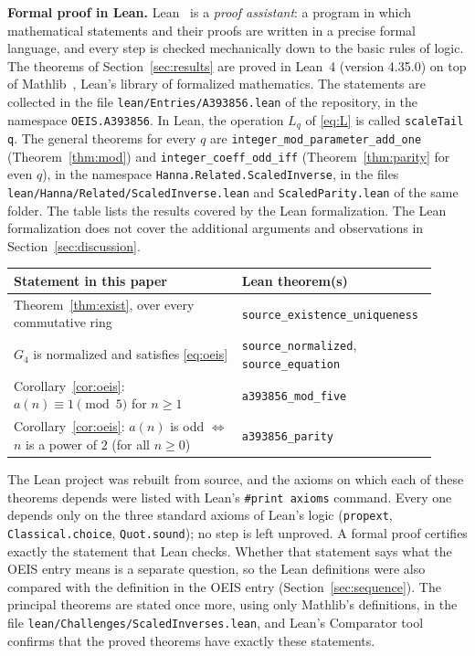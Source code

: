 \documentclass[11pt,a4paper]{article}
\theoremstyle{definition}
\theoremstyle{remark}
\newcommand{\para}[1]{\par\medskip\noindent\textbf{#1}\enspace}
\begin{document}
\para{Formal proof in Lean.}
Lean~\cite{lean} is a \emph{proof assistant}: a program in which mathematical statements and their proofs are written
in a precise formal language, and every step is checked mechanically down to the basic rules of logic. The theorems of Section~\ref{sec:results} are proved in Lean~4 (version 4.35.0) on top of
Mathlib~\cite{mathlib}, Lean's library of formalized mathematics. The statements are collected in the file \texttt{lean/Entries/A393856.lean} of the repository,
in the namespace \texttt{OEIS.A393856}. In Lean, the operation $L_q$ of \eqref{eq:L} is called \texttt{scaleTail q}. The general theorems for every $q$ are \texttt{integer\_mod\_parameter\_add\_one} (Theorem~\ref{thm:mod}) and \texttt{integer\_coeff\_odd\_iff} (Theorem~\ref{thm:parity} for even $q$), in the namespace \texttt{Hanna.\allowbreak Related.\allowbreak ScaledInverse}, in the files \texttt{lean/\allowbreak Hanna/\allowbreak Related/\allowbreak ScaledInverse.lean} and \texttt{ScaledParity.lean} of the same folder.
The table lists the results covered by the Lean formalization. The Lean formalization does not cover the additional arguments and observations in Section~\ref{sec:discussion}.
\begin{center}\small\renewcommand{\arraystretch}{1.25}
\begin{tabular}{>{\raggedright\arraybackslash}p{0.52\linewidth}>{\raggedright\arraybackslash}p{0.4\linewidth}}
\toprule
Statement in this paper & Lean theorem(s)\\
\midrule
Theorem~\ref{thm:exist}, over every commutative ring & \texttt{source\_\allowbreak{}existence\_\allowbreak{}uniqueness} \\
$G_{4}$ is normalized and satisfies \eqref{eq:oeis} & \texttt{source\_\allowbreak{}normalized}, \texttt{source\_\allowbreak{}equation} \\
Corollary~\ref{cor:oeis}: $a(n)\equiv1\pmod{5}$ for $n\ge1$ & \texttt{a393856\_\allowbreak{}mod\_\allowbreak{}five} \\
Corollary~\ref{cor:oeis}: $a(n)$ is odd $\iff$ $n$ is a power of $2$ (for all $n\ge0$) & \texttt{a393856\_\allowbreak{}parity} \\
\bottomrule
\end{tabular}
\end{center}
The Lean project was rebuilt from source, and the axioms on which each of these theorems depends were listed with
Lean's \texttt{\#print axioms} command. Every one depends only on the three standard axioms of Lean's logic
(\texttt{propext}, \texttt{Classical.choice}, \texttt{Quot.sound}); no step is left unproved. A formal proof certifies
exactly the statement that Lean checks. Whether that statement says what the OEIS entry means is a separate question,
so the Lean definitions were also compared with the definition in the OEIS entry
(Section~\ref{sec:sequence}). The principal theorems are stated once more, using only Mathlib's definitions, in the
file \texttt{lean/Challenges/ScaledInverses.lean}, and Lean's Comparator tool confirms that the
proved theorems have exactly these statements.
\end{document}
